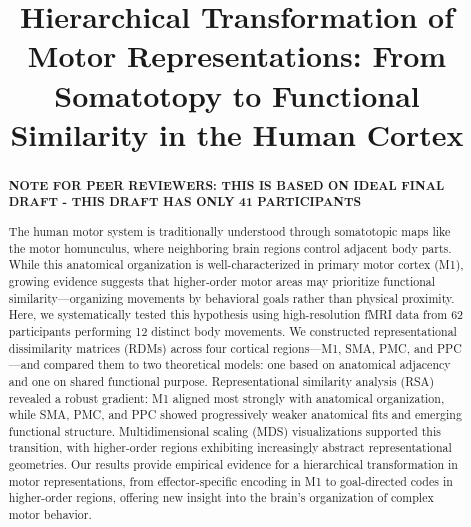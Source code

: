 \documentclass{article}
\title{ Hierarchical Transformation of Motor Representations: From Somatotopy to Functional Similarity in the Human Cortex}
\begin{document}
\maketitle


\begin{abstract}
\textbf{NOTE FOR PEER REVIEWERS: THIS IS BASED ON IDEAL FINAL DRAFT - THIS DRAFT HAS ONLY 41 PARTICIPANTS }

The human motor system is traditionally understood through somatotopic maps like the motor homunculus, where neighboring brain regions control adjacent body parts. While this anatomical organization is well-characterized in primary motor cortex (M1), growing evidence suggests that higher-order motor areas may prioritize functional similarity—organizing movements by behavioral goals rather than physical proximity. Here, we systematically tested this hypothesis using high-resolution fMRI data from 62 participants performing 12 distinct body movements. We constructed representational dissimilarity matrices (RDMs) across four cortical regions—M1, SMA, PMC, and PPC—and compared them to two theoretical models: one based on anatomical adjacency and one on shared functional purpose. Representational similarity analysis (RSA) revealed a robust gradient: M1 aligned most strongly with anatomical organization, while SMA, PMC, and PPC showed progressively weaker anatomical fits and emerging functional structure. Multidimensional scaling (MDS) visualizations supported this transition, with higher-order regions exhibiting increasingly abstract representational geometries. Our results provide empirical evidence for a hierarchical transformation in motor representations, from effector-specific encoding in M1 to goal-directed codes in higher-order regions, offering new insight into the brain’s organization of complex motor behavior.
\end{abstract}
\end{document}
